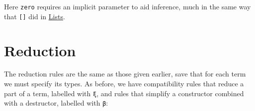 Here \texttt{zero} requires an implicit parameter to aid inference, much
in the same way that \texttt{{[}{]}} did in
\protect\hyperlink{Lists}{Lists}.

\hypertarget{reduction}{%
\section{Reduction}\label{reduction}}

The reduction rules are the same as those given earlier, save that for
each term we must specify its types. As before, we have compatibility
rules that reduce a part of a term, labelled with \texttt{ξ}, and rules
that simplify a constructor combined with a destructor, labelled with
\texttt{β}:

\begin{fence}
\begin{code}%
\>[0]\AgdaSpace{}%
\AgdaSpace{}%
\<%
\\
%
\\[\AgdaEmptyExtraSkip]%
\>[0]\AgdaSpace{}%
\AgdaSpace{}%
\AgdaSymbol{:}\AgdaSpace{}%
\AgdaSpace{}%
\AgdaSymbol{\{}\AgdaSpace{}%
\AgdaSymbol{\}}\AgdaSpace{}%
\AgdaSpace{}%
\AgdaSymbol{(}\AgdaSpace{}%
\AgdaSpace{}%
\AgdaSymbol{)}\AgdaSpace{}%
\AgdaSpace{}%
\AgdaSymbol{(}\AgdaSpace{}%
\AgdaSpace{}%
\AgdaSymbol{)}\AgdaSpace{}%
\AgdaSpace{}%
\AgdaSpace{}%
\<%
\\
%
\\[\AgdaEmptyExtraSkip]%
\>[0][@{}l@{\AgdaIndent{0}}]%
\>[2]\AgdaSpace{}%
\AgdaSymbol{:}\AgdaSpace{}%
\AgdaSpace{}%
\AgdaSymbol{\{}\AgdaSpace{}%
\AgdaSpace{}%
\AgdaSymbol{\}}\AgdaSpace{}%
\AgdaSymbol{\{}\AgdaSpace{}%
\AgdaSpace{}%
\AgdaSymbol{:}\AgdaSpace{}%
\AgdaSpace{}%
\AgdaSpace{}%
\AgdaSpace{}%
\AgdaSpace{}%
\AgdaSymbol{\}}\AgdaSpace{}%
\AgdaSymbol{\{}\AgdaSpace{}%
\AgdaSymbol{:}\AgdaSpace{}%
\AgdaSpace{}%
\AgdaSpace{}%
\AgdaSymbol{\}}\<%

\end{code}
\end{fence}

